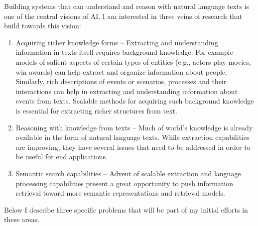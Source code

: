 \documentclass[a4paper,11pt,onecolumn]{article}
\begin{document}
Building systems that can understand and reason with natural language texts is one of the central visions of AI. 	 
I am interested in three veins of research that build towards this vision: 
\begin{enumerate}
\item Acquiring richer knowledge forms -- Extracting and understanding information in texts itself requires background knowledge. For example models of salient aspects of certain types of entities (e.g., actors play movies, win awards) can help extract and organize information about people. Similarly, rich descriptions of events or scenarios, processes and their interactions can help in extracting and understanding information about events from texts. Scalable methods for acquiring such background knowledge is essential for extracting richer structures from text.  
\item Reasoning with knowledge from texts -- Much of world's knowledge is already available in the form of natural language texts. While extraction capabilities are improving, they have several issues that need to be addressed in order to be useful for end applications. 
\item Semantic search capabilities -- Advent of scalable extraction and language processing capabilities present a great opportunity to push information retrieval toward more semantic representations and retrieval models.
\end{enumerate}
Below I describe three specific problems that will be part of my initial efforts in these areas.

\end{document}

